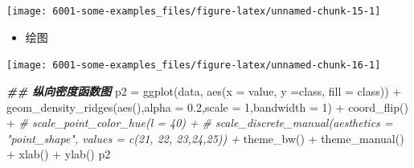 \documentclass[
]{book}
\newenvironment{Shaded}{\begin{snugshade}}{\end{snugshade}}
\newcommand{\AttributeTok}[1]{\textcolor[rgb]{0.77,0.63,0.00}{#1}}
\newcommand{\CommentTok}[1]{\textcolor[rgb]{0.56,0.35,0.01}{\textit{#1}}}
\newcommand{\DecValTok}[1]{\textcolor[rgb]{0.00,0.00,0.81}{#1}}
\newcommand{\DocumentationTok}[1]{\textcolor[rgb]{0.56,0.35,0.01}{\textbf{\textit{#1}}}}
\newcommand{\FloatTok}[1]{\textcolor[rgb]{0.00,0.00,0.81}{#1}}
\newcommand{\FunctionTok}[1]{\textcolor[rgb]{0.00,0.00,0.00}{#1}}
\newcommand{\NormalTok}[1]{#1}
\newcommand{\OtherTok}[1]{\textcolor[rgb]{0.56,0.35,0.01}{#1}}
\newcommand{\SpecialCharTok}[1]{\textcolor[rgb]{0.00,0.00,0.00}{#1}}
\newcommand{\StringTok}[1]{\textcolor[rgb]{0.31,0.60,0.02}{#1}}
\providecommand{\tightlist}{%
  \setlength{\itemsep}{0pt}\setlength{\parskip}{0pt}}
\begin{document}
\begin{center}\texttt{[image: 6001-some-examples\_files/figure-latex/unnamed-chunk-15-1]} \end{center}

\begin{itemize}
\tightlist
\item
  绘图
\end{itemize}

\begin{Shaded}
\end{Shaded}

\begin{center}\texttt{[image: 6001-some-examples\_files/figure-latex/unnamed-chunk-16-1]} \end{center}

\begin{Shaded}
\begin{Highlighting}[]
\DocumentationTok{\#\# 纵向密度函数图}
\NormalTok{p2 }\OtherTok{=} \FunctionTok{ggplot}\NormalTok{(data, }\FunctionTok{aes}\NormalTok{(}\AttributeTok{x =}\NormalTok{  value, }\AttributeTok{y =}\NormalTok{class, }\AttributeTok{fill =}\NormalTok{ class)) }\SpecialCharTok{+}
  \FunctionTok{geom\_density\_ridges}\NormalTok{(}\FunctionTok{aes}\NormalTok{(),}\AttributeTok{alpha =} \FloatTok{0.2}\NormalTok{,}\AttributeTok{scale =} \DecValTok{1}\NormalTok{,}\AttributeTok{bandwidth =} \DecValTok{1}\NormalTok{) }\SpecialCharTok{+}
  \FunctionTok{coord\_flip}\NormalTok{() }\SpecialCharTok{+} 
  \CommentTok{\# scale\_point\_color\_hue(l = 40) +}
  \CommentTok{\# scale\_discrete\_manual(aesthetics = "point\_shape", values = c(21, 22, 23,24,25)) +}
  \FunctionTok{theme\_bw}\NormalTok{() }\SpecialCharTok{+}
  \FunctionTok{theme\_manual}\NormalTok{() }\SpecialCharTok{+} \FunctionTok{xlab}\NormalTok{(}\StringTok{\textquotesingle{}\textquotesingle{}}\NormalTok{) }\SpecialCharTok{+} \FunctionTok{ylab}\NormalTok{(}\StringTok{\textquotesingle{}\textquotesingle{}}\NormalTok{)}
\NormalTok{p2}
\end{Highlighting}
\end{Shaded}
\end{document}
